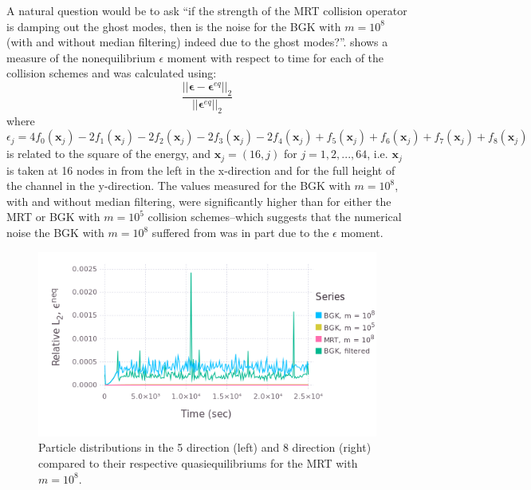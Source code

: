 \documentclass{article}
\newcommand{\pos}{\mathbf{x}}
\begin{document}
A natural question would be to ask ``if the strength of the MRT collision operator is damping out the ghost modes, then is the noise for the BGK with $m = 10^8$ (with and without median filtering) indeed due to the ghost modes?''.
 shows a measure of the nonequilibrium $\epsilon$ moment with respect to time for each of the collision schemes and was calculated using:
\begin{equation}
\frac{||\boldsymbol{\epsilon} - \boldsymbol{\epsilon}^{eq}||_2}{||\boldsymbol{\epsilon}^{eq}||_2}
\end{equation}
\noindent where $\epsilon_j = 4f_0(\pos_j) - 2f_1(\pos_j) - 2f_2(\pos_j) - 2f_3(\pos_j) - 2f_4(\pos_j) + f_5(\pos_j) + f_6(\pos_j) + f_7(\pos_j) + f_8(\pos_j)$ is related to the square of the energy, and $\pos_j = (16, j)$ for $j = 1, 2, ..., 64$, i.e. $\pos_j$ is taken at 16 nodes in from the left in the x-direction and for the full height of the channel in the y-direction.
The values measured for the BGK with $m = 10^8$, with and without median filtering, were significantly higher than for either the MRT or BGK with $m = 10^5$ collision schemes--which suggests that the numerical noise the BGK with $m = 10^8$ suffered from was in part due to the $\epsilon$ moment.

\begin{figure}
    \includegraphics[width=\linewidth]{figs/poise-bingham/epsilon}
    \caption{Particle distributions in the 5 direction (left) and 8 direction (right) compared to their respective quasiequilibriums for the MRT with $m = 10^8$.}
    \label{fig:epsilon}
\end{figure}
\end{document}

